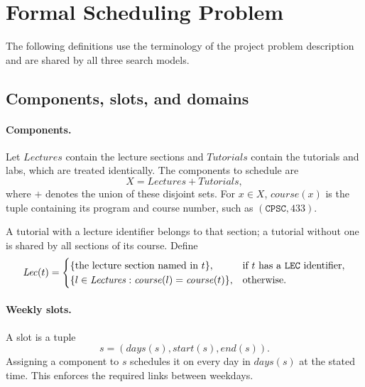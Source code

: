 \ifdefined\savedparindent\else\newlength{\savedparindent}\fi
\ifdefined\savedparskip\else\newlength{\savedparskip}\fi
\setlength{\savedparindent}{\parindent}
\setlength{\savedparskip}{\parskip}
\setlength{\parindent}{0pt}
\setlength{\parskip}{0.6\baselineskip plus 2pt}

\section{Formal Scheduling Problem}
\label{sec:problem}

The following definitions use the terminology
of the project problem description~\cite{problem} and are
shared by all three search models.

\subsection{Components, slots, and domains}
\label{sec:components}

\paragraph{Components.}
Let $\mathit{Lectures}$ contain the lecture sections and
$\mathit{Tutorials}$ contain the tutorials and labs, which
are treated identically. The components to schedule are
\[
X=\mathit{Lectures}+\mathit{Tutorials},
\]
where $+$ denotes the union of these disjoint sets.
For $x\in X$, $\mathit{course}(x)$ is the tuple containing
its program and course number, such as $(\texttt{CPSC},433)$.

A tutorial with a lecture identifier belongs to that section;
a tutorial without one is shared by all sections of its course.
Define
\begin{equation}
\mathit{Lec}(t)=
\begin{cases}
\{\text{the lecture section named in }t\},
  & \text{if }t\text{ has a \texttt{LEC} identifier},\\
\{l\in\mathit{Lectures}:
  \mathit{course}(l)=\mathit{course}(t)\},
  & \text{otherwise}.
\end{cases}
\label{eq:parent}
\end{equation}

\paragraph{Weekly slots.}
A slot is a tuple
\begin{equation}
s=(\mathit{days}(s),\mathit{start}(s),\mathit{end}(s)).
\label{eq:slot}
\end{equation}
Assigning a component to $s$ schedules it on every day in
$\mathit{days}(s)$ at the stated time. This enforces the
required links between weekdays.

